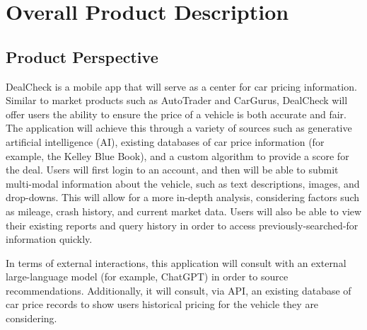 \documentclass[]{article}
\begin{document}

\section{Overall Product Description}
\label{sec:overall_description}

\subsection{Product Perspective}
\label{sub:product_perspective}
DealCheck is a mobile app that will serve as a center for car pricing information. Similar to market products such as AutoTrader and CarGurus, DealCheck 
will offer users the ability to ensure the price of a vehicle is both accurate and fair. The application will achieve this through a variety of sources 
such as generative artificial intelligence (AI), existing databases of car price information (for example, the Kelley Blue Book), and a custom algorithm 
to provide a score for the deal. Users will first login to an account, and then will be able to submit multi-modal information about the vehicle, such as 
text descriptions, images, and drop-downs. This will allow for a more in-depth analysis, considering factors such as mileage, crash history, and current 
market data. Users will also be able to view their existing reports and query history in order to access previously-searched-for information quickly. \newline

\noindent In terms of external interactions, this application will consult with an external large-language model (for example, ChatGPT) in order to source recommendations. 
Additionally, it will consult, via API, an existing database of car price records to show users historical pricing for the vehicle they are considering.
\end{document}
